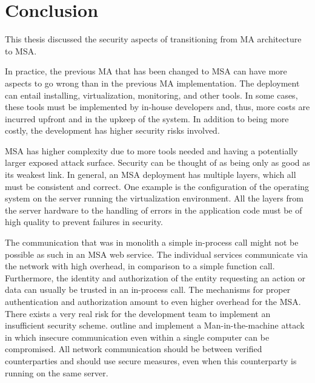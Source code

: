 \section{Conclusion}
\begin{sloppypar}
    This thesis discussed the security aspects of transitioning from MA architecture to MSA.
\end{sloppypar}
\begin{sloppypar}
    In practice, the previous MA that has been changed to MSA can have more
    aspects to go wrong than in the previous MA implementation. The deployment
    can entail installing, virtualization, monitoring, and other tools. In some
    cases, these tools must be implemented by in-house developers and, thus,
    more costs are incurred upfront and in the upkeep of the system. In addition
    to being more costly, the development has higher security risks involved.
\end{sloppypar}
\begin{sloppypar}
    MSA has higher complexity due to more tools needed and having a potentially
    larger exposed attack surface. Security can be thought of as being only as
    good as its weakest link. In general, an MSA deployment has multiple layers,
    which all must be consistent and correct. One example is the configuration
    of the operating system on the server running the virtualization
    environment. All the layers from the server hardware to the handling of
    errors in the application code must be of high quality to prevent failures
    in security.
\end{sloppypar}
\begin{sloppypar}
    The communication that was in monolith a simple in-process call might not be
    possible as such in an MSA web service. The individual services communicate
    via the network with high overhead, in comparison to a simple function call.
    Furthermore, the identity and authorization of the entity requesting an
    action or data can usually be trusted in an in-process call. The mechanisms
    for proper authentication and authorization amount to even higher overhead
    for the MSA. There exists a very real risk for the development team to
    implement an insufficient security scheme. \citet{maninthemachine} outline
    and implement a Man-in-the-machine attack in which insecure communication
    even within a single computer can be compromised. All network communication
    should be between verified counterparties and should use secure measures,
    even when this counterparty is running on the same server.
\end{sloppypar}

